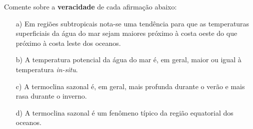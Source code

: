 \documentclass[letterpaper,portuguese,12pt,pdftex]{exam}
\begin{document}
\begin{questions}
  \question[4]
  Comente sobre a {\bf veracidade} de cada afirmação abaixo:
  \begin{itemize}
    \item[a)] Em regiões subtropicais nota-se uma tendência para que as
              temperaturas superficiais da água do mar sejam maiores próximo à
              costa oeste do que próximo à costa leste dos oceanos.
    \item[b)] A temperatura potencial da água do mar é, em geral, maior ou igual
              à temperatura {\it in-situ}.
    \item[c)] A termoclina sazonal é, em geral, mais profunda durante o verão e
              mais rasa durante o inverno.
    \item[d)] A termoclina sazonal é um fenômeno típico da região equatorial dos
              oceanos.
  \end{itemize}

\end{questions}
\end{document}
